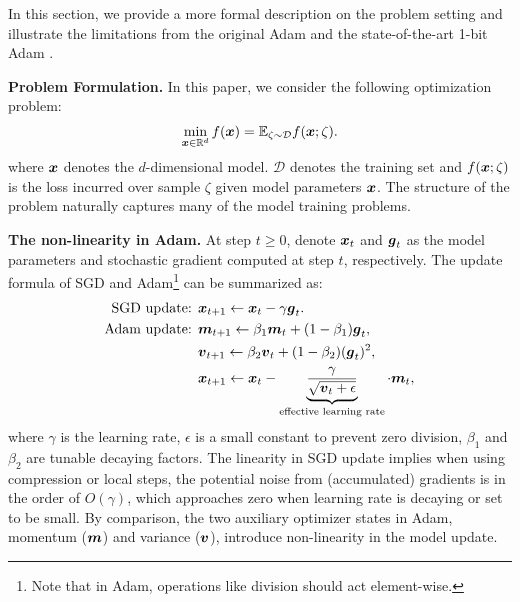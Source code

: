 In this section, we provide a more formal description on the problem setting and illustrate the limitations from the original Adam and the state-of-the-art 1-bit Adam \citep{tang20211}.

\textbf{Problem Formulation.}
In this paper, we consider the following optimization problem:
\begin{align}
    \min_{\boldsymbol{x}\in\mathbb{R}^d}f(\boldsymbol{x}) = \mathbb{E}_{\zeta\sim\mathcal{D}}f(\boldsymbol{x};\zeta).
\end{align}
where $\boldsymbol{x}$ denotes the $d$-dimensional model. $\mathcal{D}$ denotes the training set and $f(\boldsymbol{x};\zeta)$ is the loss incurred over sample $\zeta$ given model parameters $\boldsymbol{x}$.
The structure of the problem naturally captures many of the model training problems.

\textbf{The non-linearity in Adam.}
At step $t\geq 0$, denote $\boldsymbol{x}_t$ and $\boldsymbol{g}_t$ as the model parameters and stochastic gradient computed at step $t$, respectively. The update formula of SGD and Adam\footnote{Note that in Adam, operations like division should act element-wise.} can be summarized as:
\begin{align}
\label{equa:SGD_update}
\text{SGD update: } & \boldsymbol{x}_{t+1} \leftarrow \boldsymbol{x}_t - \gamma \boldsymbol{g}_t. \\
\text{Adam update: } & \boldsymbol{m}_{t+1} \leftarrow \beta_1\boldsymbol{m}_{t} + (1-\beta_1)\boldsymbol{g}_t, \nonumber \\
& \boldsymbol{v}_{t+1} \leftarrow \beta_2\boldsymbol{v}_{t} + (1-\beta_2)(\boldsymbol{g}_t)^2, \nonumber \\
    \label{equa:Adam_update}
    & \boldsymbol{x}_{t+1} \leftarrow \boldsymbol{x}_t - \underbrace{\frac{\gamma}{\sqrt{\boldsymbol{v}_t + \epsilon}}}_{\text{effective learning rate}} \cdot \boldsymbol{m}_t,
\end{align}
where $\gamma$ is the learning rate, $\epsilon$ is a small constant to prevent zero division, $\beta_1$ and $\beta_2$ are tunable decaying factors.
The linearity in SGD update implies when using compression or local steps, the potential noise from (accumulated) gradients is in the order of $O(\gamma)$, which approaches zero when learning rate is decaying or set to be small. By comparison, the two auxiliary optimizer states in Adam, momentum ($\boldsymbol{m}$) and variance ($\boldsymbol{v}$), introduce non-linearity in the model update. 

